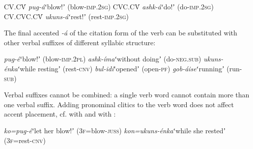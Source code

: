 \documentclass[output=paper,modfonts,nonflat,hidelinks]{langsci/langscibook}
\begin{document}
\begin{exe}
\ex \begin{xlist}
\ex CV.CV́ \hspace{12mm}\textit{pug-á}\hspace{12mm}ʻblow!ʼ (blow-\textsc{imp}.2\textsc{sg})
\ex CVC.CV́ \hspace{9mm}\textit{ashk-á}\hspace{11mm}ʻdo!ʼ (do-\textsc{imp}.2\textsc{sg})
\ex CV.CVC.CV́ \hspace{3mm}\textit{ukuns-á}\hspace{10mm}ʻrest!ʼ (rest-\textsc{imp}.2\textsc{sg})
\end{xlist}
\end{exe}
The final accented \textit{-á} of the citation form of the verb can be substituted with other verbal suffixes of different syllabic structure:

\begin{exe}
\ex \begin{xlist}
\ex \textit{pug-é}\hspace{13mm}ʻblow!ʼ (blow-\textsc{imp}.2\textsc{pl}) \label{ex:Petrollino:pugé}
\ex \textit{ashk-íma}\hspace{7mm}ʻwithout doingʼ (do-\textsc{neg}.\textsc{sub})
\ex \textit{ukuns-énka}\hspace{4mm}ʻwhile restingʼ (rest-\textsc{cnv}) \label{ex:Petrollino:uskenka}
\ex \textit{bul-idí}\hspace{12mm}ʻopenedʼ (open-\textsc{pf})
\ex \textit{gob-áise}\hspace{10mm}ʻrunningʼ (run-\textsc{sub})
\end{xlist} \label{ex:Petrollino:grammaticalstress}
\end{exe}

Verbal suffixes cannot be combined: a single verb word cannot contain more than one verbal suffix. Adding pronominal  clitics to the verb word does not affect accent placement, cf.  with  and  with :

\begin{exe}
\ex \begin{xlist}
\ex \textit{ko=pug-é}\hspace{11mm}ʻlet her blow!ʼ (3\textsc{f}=blow-\textsc{juss}) \label{ex:Petrollino:kopugé}
\ex \textit{kon=ukuns-énka}\hspace{1mm}ʻwhile she restedʼ (3\textsc{f}=rest-\textsc{cnv}) \label{ex:Petrollino:konuskenka}
\end{xlist}
\end{exe}
\end{document}
